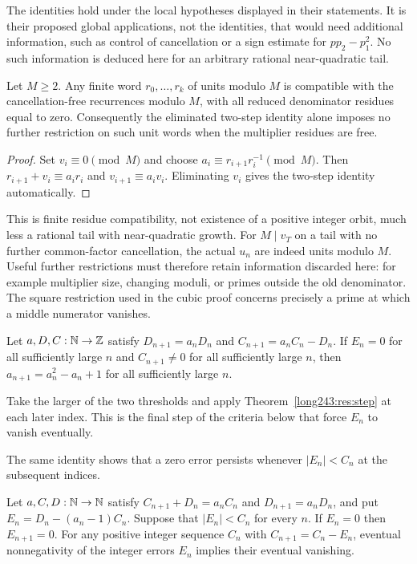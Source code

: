 \documentclass[11pt]{article}
\begin{document}
The identities hold under the local hypotheses displayed in their
statements. It is their proposed global applications, not the identities,
that would need additional information, such as control of cancellation or
a sign estimate for $pp_2-p_1^2$. No such information is deduced here for
an arbitrary rational near-quadratic tail.

\begin{lemma}\label{long243:res:oldmodulussaturation}
Let $M\ge2$. Any finite word $r_0,\ldots,r_k$ of units modulo $M$ is
compatible with the cancellation-free recurrences modulo $M$, with all
reduced denominator residues equal to zero. Consequently the eliminated
two-step identity alone imposes no further restriction on such unit words
when the multiplier residues are free.
\end{lemma}
\begin{proof}
Set $v_i\equiv0\pmod M$ and choose
$a_i\equiv r_{i+1}r_i^{-1}\pmod M$. Then
$r_{i+1}+v_i\equiv a_ir_i$ and $v_{i+1}\equiv a_iv_i$.
Eliminating $v_i$ gives the two-step identity automatically.
\end{proof}
This is finite residue compatibility, not existence of a positive integer
orbit, much less a rational tail with near-quadratic growth.
For $M\mid v_T$ on a tail with no further common-factor cancellation,
the actual $u_n$ are indeed units modulo
$M$. Useful further restrictions must therefore retain information discarded
here: for example multiplier size, changing moduli, or primes outside the
old denominator. The square restriction used in the cubic proof concerns
precisely a prime at which a middle numerator vanishes.

\begin{theorem}\label{long243:res:eventual}
Let $a,D,C:\mathbb{N}\to\mathbb{Z}$ satisfy $D_{n+1}=a_nD_n$ and
$C_{n+1}=a_nC_n-D_n$.  If $E_n=0$ for all sufficiently large $n$ and
$C_{n+1}\ne0$ for all sufficiently large $n$, then $a_{n+1}=a_n^{2}-a_n+1$ for
all sufficiently large $n$.
\end{theorem}

  Take the larger of the two thresholds and apply
Theorem~\ref{long243:res:step} at each later index. This is the final
step of the criteria below that force $E_n$ to vanish eventually.

The same identity shows that a zero error persists whenever
$|E_n|<C_n$ at the subsequent indices.

\begin{theorem}\label{long243:res:absorb}
Let $a,C,D:\mathbb{N}\to\mathbb{N}$ satisfy $C_{n+1}+D_n=a_nC_n$ and
$D_{n+1}=a_nD_n$, and put $E_n=D_n-(a_n-1)C_n$.
Suppose that $|E_n|<C_n$ for every $n$.  If $E_n=0$ then $E_{n+1}=0$.
For any positive integer sequence $C_n$ with $C_{n+1}=C_n-E_n$,
eventual nonnegativity of the integer errors $E_n$ implies their
 eventual vanishing.
\end{theorem}
\end{document}
